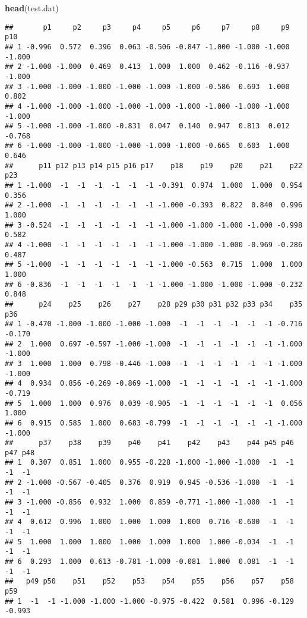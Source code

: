 \documentclass[]{article}
\newenvironment{Shaded}{\begin{snugshade}}{\end{snugshade}}
\newcommand{\KeywordTok}[1]{\textcolor[rgb]{0.13,0.29,0.53}{\textbf{#1}}}
\newcommand{\NormalTok}[1]{#1}
\begin{document}
\begin{Shaded}
\begin{Highlighting}[]
\KeywordTok{head}\NormalTok{(test.dat)}
\end{Highlighting}
\end{Shaded}

\begin{verbatim}
##       p1     p2     p3     p4     p5     p6     p7     p8     p9    p10
## 1 -0.996  0.572  0.396  0.063 -0.506 -0.847 -1.000 -1.000 -1.000 -1.000
## 2 -1.000 -1.000  0.469  0.413  1.000  1.000  0.462 -0.116 -0.937 -1.000
## 3 -1.000 -1.000 -1.000 -1.000 -1.000 -1.000 -0.586  0.693  1.000  0.802
## 4 -1.000 -1.000 -1.000 -1.000 -1.000 -1.000 -1.000 -1.000 -1.000 -1.000
## 5 -1.000 -1.000 -1.000 -0.831  0.047  0.140  0.947  0.813  0.012 -0.768
## 6 -1.000 -1.000 -1.000 -1.000 -1.000 -1.000 -0.665  0.603  1.000  0.646
##      p11 p12 p13 p14 p15 p16 p17    p18    p19    p20    p21    p22   p23
## 1 -1.000  -1  -1  -1  -1  -1  -1 -0.391  0.974  1.000  1.000  0.954 0.356
## 2 -1.000  -1  -1  -1  -1  -1  -1 -1.000 -0.393  0.822  0.840  0.996 1.000
## 3 -0.524  -1  -1  -1  -1  -1  -1 -1.000 -1.000 -1.000 -1.000 -0.998 0.582
## 4 -1.000  -1  -1  -1  -1  -1  -1 -1.000 -1.000 -1.000 -0.969 -0.286 0.487
## 5 -1.000  -1  -1  -1  -1  -1  -1 -1.000 -0.563  0.715  1.000  1.000 1.000
## 6 -0.836  -1  -1  -1  -1  -1  -1 -1.000 -1.000 -1.000 -1.000 -0.232 0.848
##      p24    p25    p26    p27    p28 p29 p30 p31 p32 p33 p34    p35    p36
## 1 -0.470 -1.000 -1.000 -1.000 -1.000  -1  -1  -1  -1  -1  -1 -0.716 -0.170
## 2  1.000  0.697 -0.597 -1.000 -1.000  -1  -1  -1  -1  -1  -1 -1.000 -1.000
## 3  1.000  1.000  0.798 -0.446 -1.000  -1  -1  -1  -1  -1  -1 -1.000 -1.000
## 4  0.934  0.856 -0.269 -0.869 -1.000  -1  -1  -1  -1  -1  -1 -1.000 -0.719
## 5  1.000  1.000  0.976  0.039 -0.905  -1  -1  -1  -1  -1  -1  0.056  1.000
## 6  0.915  0.585  1.000  0.683 -0.799  -1  -1  -1  -1  -1  -1 -1.000 -1.000
##      p37    p38    p39    p40    p41    p42    p43    p44 p45 p46 p47 p48
## 1  0.307  0.851  1.000  0.955 -0.228 -1.000 -1.000 -1.000  -1  -1  -1  -1
## 2 -1.000 -0.567 -0.405  0.376  0.919  0.945 -0.536 -1.000  -1  -1  -1  -1
## 3 -1.000 -0.856  0.932  1.000  0.859 -0.771 -1.000 -1.000  -1  -1  -1  -1
## 4  0.612  0.996  1.000  1.000  1.000  1.000  0.716 -0.600  -1  -1  -1  -1
## 5  1.000  1.000  1.000  1.000  1.000  1.000  1.000 -0.034  -1  -1  -1  -1
## 6  0.293  1.000  0.613 -0.781 -1.000 -0.081  1.000  0.081  -1  -1  -1  -1
##   p49 p50    p51    p52    p53    p54    p55    p56    p57    p58    p59
## 1  -1  -1 -1.000 -1.000 -1.000 -0.975 -0.422  0.581  0.996 -0.129 -0.993

\end{verbatim}
\end{document}
